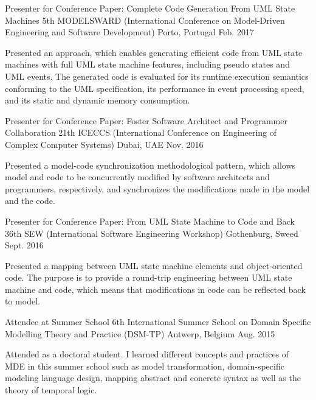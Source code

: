 \begin{cventries}

\cventry
{Presenter for Conference Paper: Complete Code Generation From UML State Machines} %
{5th MODELSWARD (International Conference on Model-Driven Engineering and Software Development)} %
{Porto, Portugal} %
{Feb. 2017} %
{ %
	\begin{cvitems}
		\item {Presented an approach, which enables generating efficient code from UML state machines with full UML state machine features, including pseudo states and UML events. The generated code is evaluated for its runtime execution semantics conforming to the UML specification, its performance in event processing speed, and its static and dynamic memory consumption.}
	\end{cvitems}
}


\cventry
{Presenter for Conference Paper: Foster Software Architect and Programmer Collaboration} %
{21th ICECCS (International Conference on Engineering of Complex Computer Systems)} %
{Dubai, UAE} %
{Nov. 2016} %
{ %
	\begin{cvitems}
		\item {Presented a model-code synchronization methodological pattern, which allows model and code to be concurrently modified by software architects and programmers, respectively, and synchronizes the modifications made in the model and the code.}
	\end{cvitems}
}


\cventry
{Presenter for Conference Paper: From UML State Machine to Code and Back} %
{36th SEW (International Software Engineering Workshop)} %
{Gothenburg, Sweed} %
{Sept. 2016} %
{ %
	\begin{cvitems}
		\item {Presented a mapping between UML state machine elements and object-oriented code. The purpose is to provide a round-trip engineering between UML state machine and code, which means that modifications in code can be reflected back to model.}
	\end{cvitems}
}

\cventry
{Attendee at Summer School} %
{6th International Summer School on Domain Specific Modelling Theory and Practice (DSM-TP)} %
{Antwerp, Belgium} %
{Aug. 2015} %
{ %
	\begin{cvitems}
		\item {Attended as a doctoral student. I learned different concepts and practices of MDE in this summer school such as model transformation, domain-specific modeling language design, mapping abstract and concrete syntax as well as the theory of temporal logic.}
	\end{cvitems}
}

\end{cventries}